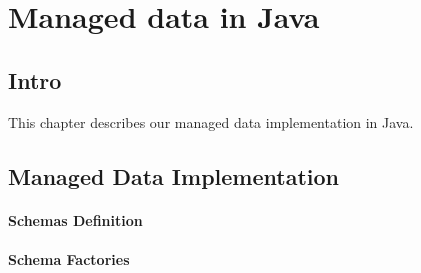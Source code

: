 
\chapter{Managed data in Java}\label{Implementation}
\section{Intro}\label{sec:Intro Implementation}
This chapter describes our managed data implementation in Java.

\section{Managed Data Implementation}\label{sec:Managed Data Implementation}

\subsubsection{Schemas Definition}\label{Schema Definition}



\subsubsection{Schema Factories}\label{Schema Factories}


